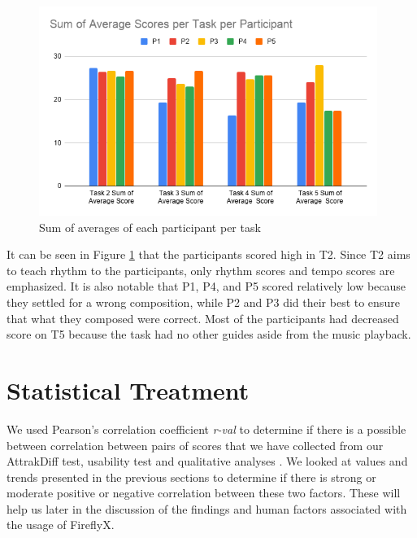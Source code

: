 \begin{figure}[H]
    \centering
    \includegraphics[width=11cm]{figures/Results/SumOfTotalAverage.png}
    \caption{Sum of averages of each participant per task}
    \label{fig:SumOfTotalAverage}
\end{figure}

It can be seen in Figure \ref{fig:SumOfTotalAverage} that the participants scored high in T2. Since T2 aims to teach rhythm to the participants, only rhythm scores and tempo scores are emphasized. It is also notable that P1, P4, and P5 scored relatively low because they settled for a wrong composition, while P2 and P3 did their best to ensure that what they composed were correct. Most of the participants had decreased score on T5 because the task had no other guides aside from the music playback.

\section{Statistical Treatment}

We used Pearson's correlation coefficient \textit{r-val} to determine if there is a possible between correlation between pairs of scores that we have collected from our AttrakDiff test, usability test and qualitative analyses \cite{hauke2011comparison}. We looked at values and trends presented in the previous sections to determine if there is strong or moderate positive or negative correlation between these two factors. These will help us later in the discussion of the findings and human factors associated with the usage of FireflyX. 

